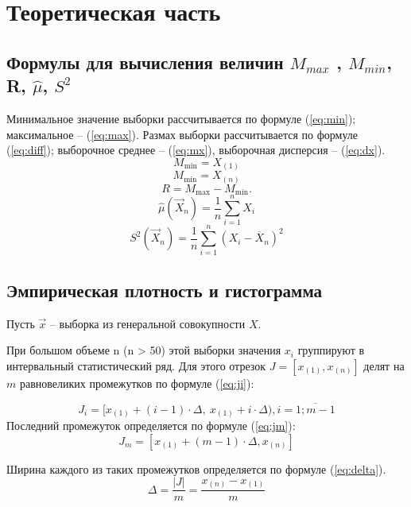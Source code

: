 \chapter{Теоретическая часть}
\section{Формулы для вычисления величин $M_{max}$ , $M_{min}$, R, $\hat\mu$, $S^2$}
Минимальное значение выборки рассчитывается по формуле (\ref{eq:min}); максимальное -- (\ref{eq:max}). Размах выборки рассчитывается по формуле (\ref{eq:diff}); выборочное среднее -- (\ref{eq:mx}), выборочная дисперсия -- (\ref{eq:dx}).
\begin{equation}
	\label{eq:min}
	M_{\min} = X_{(1)}
\end{equation}
\begin{equation}
	\label{eq:max}
	M_{\min} = X_{(n)}
\end{equation}
\begin{equation}
	\label{eq:diff}
	R = M_{\max} - M_{\min}.
\end{equation}
\begin{equation}
	\label{eq:mx}
	\hat\mu(\vec X_n) = \frac 1n \sum_{i=1}^n X_i
\end{equation}
\begin{equation}
	\label{eq:dx}
	S^2(\vec X_n) = \frac 1{n} \sum_{i=1}^n (X_i-\overline X_n)^2
\end{equation}

\section{Эмпирическая плотность и гистограмма}
Пусть $\vec x$ -- выборка из генеральной совокупности $X$. 

При большом объеме n (n > 50) этой выборки  значения $x_i$ группируют в интервальный статистический ряд. Для этого отрезок $J = [x_{(1)}, x_{(n)}]$ делят на $m$ равновеликих промежутков по формуле (\ref{eq:ji}):

\begin{equation}
	\label{eq:ji}
	J_i = [x_{(1)} + (i - 1) \cdot \Delta,\ x_{(1)} + i \cdot \Delta), i = \overline{1; m - 1}
\end{equation}
Последний промежуток определяется по формуле (\ref{eq:jm}):
\begin{equation}
	\label{eq:jm}
	J_{m} = [x_{(1)} + (m - 1) \cdot \Delta, x_{(n)}]
\end{equation}

Ширина каждого из таких промежутков определяется по формуле (\ref{eq:delta}).
\begin{equation}
	\label{eq:delta}
	\Delta = \frac{|J|}{m} = \frac{x_{(n)} - x_{(1)}}{m}
\end{equation}

